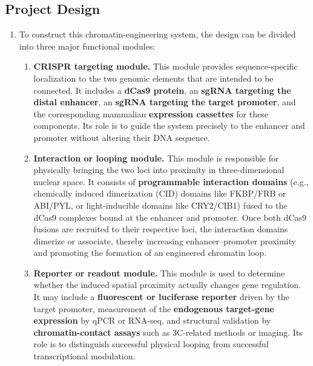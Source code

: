 \documentclass[12pt,a4paper]{article}
\begin{document}
\subsection{Project Design}
\begin{enumerate}[parsep=0.5\baselineskip]
  \item To construct this chromatin-engineering system, the design can be divided into three major functional modules:
  \begin{enumerate}
    \item \textbf{CRISPR targeting module.} This module provides sequence-specific localization to the two genomic elements that are intended to be connected. It includes a \textbf{dCas9 protein}, an \textbf{sgRNA targeting the distal enhancer}, an \textbf{sgRNA targeting the target promoter}, and the corresponding mammalian \textbf{expression cassettes} for these components. Its role is to guide the system precisely to the enhancer and promoter without altering their DNA sequence.
    \item \textbf{Interaction or looping module.} This module is responsible for physically bringing the two loci into proximity in three-dimensional nuclear space. It consists of \textbf{programmable interaction domains} (e.g., chemically induced dimerization (CID) domains like FKBP/FRB or ABI/PYL, or light-inducible domains like CRY2/CIB1) fused to the dCas9 complexes bound at the enhancer and promoter. Once both dCas9 fusions are recruited to their respective loci, the interaction domains dimerize or associate, thereby increasing enhancer--promoter proximity and promoting the formation of an engineered chromatin loop.
    \item \textbf{Reporter or readout module.} This module is used to determine whether the induced spatial proximity actually changes gene regulation. It may include a \textbf{fluorescent or luciferase reporter} driven by the target promoter, measurement of the \textbf{endogenous target-gene expression} by qPCR or RNA-seq, and structural validation by \textbf{chromatin-contact assays} such as 3C-related methods or imaging. Its role is to distinguish successful physical looping from successful transcriptional modulation.
  \end{enumerate}


\end{enumerate}
\end{document}
